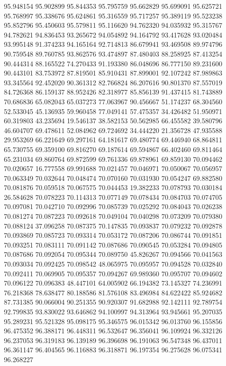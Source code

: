 95.948154
95.902899
95.844353
95.795759
95.662829
95.699091
95.625721
95.768997
95.338676
95.624861
95.316559
95.717257
95.389119
95.523238
95.852796
95.450603
95.579811
95.116620
94.762320
94.035932
95.315767
94.782621
94.836453
93.265672
94.054892
94.164792
93.417628
93.020484
93.995148
91.374233
94.165164
92.714813
86.679941
93.469508
89.974796
90.759548
89.760785
93.862576
93.474897
87.480403
88.258925
87.413254
90.444314
88.165522
74.270433
91.193380
86.048696
86.777150
89.231600
90.443101
83.753972
87.819501
85.910431
87.899001
92.107242
87.989863
93.345564
92.452020
90.361312
82.766824
86.207616
90.801370
87.557019
84.726368
86.159137
88.952426
82.318977
85.856139
91.437415
81.743889
70.686836
65.082043
65.037273
77.063967
90.456667
51.174237
68.304560
52.533045
45.136935
59.960458
77.049141
57.475357
34.426482
51.950971
60.319803
43.235694
19.546137
38.582153
50.562985
66.455582
39.580796
46.604707
69.478611
52.084962
69.724692
34.444220
21.356728
47.935588
29.953269
66.221649
69.297161
64.181617
69.480774
69.446940
68.864811
65.730755
69.359100
69.816270
69.187614
69.594867
66.402460
69.811464
65.231034
69.860764
69.872599
69.761336
69.878961
69.859130
70.094462
70.020657
16.777558
69.991688
70.021457
70.046971
70.050067
70.056957
70.063349
70.032644
70.048474
70.070160
70.031930
70.054247
69.882580
70.081876
70.059518
70.067575
70.044453
19.382233
70.078793
70.030184
26.584628
70.078223
70.114313
70.077149
70.078434
70.084703
70.074705
70.097081
70.042710
70.092996
70.085739
70.025292
70.084043
70.026238
70.081274
70.087223
70.092618
70.049104
70.040298
70.073209
70.079380
70.088124
37.096258
70.087375
70.147835
70.093837
70.079232
70.092878
70.093869
70.085723
70.093314
70.053172
70.087206
70.086744
70.091851
70.093251
70.083111
70.091142
70.087686
70.090545
70.053284
70.094805
70.087686
70.092054
70.095344
70.089750
45.826267
70.094566
70.041563
70.093034
70.092425
70.098542
48.065975
70.095957
70.094528
70.032840
70.092411
70.069905
70.095357
70.094267
69.989360
70.095707
70.094602
70.096122
70.096383
48.447101
64.005902
66.194382
73.145327
74.236991
76.218368
78.638477
80.188586
81.576108
83.496984
84.622422
85.924682
87.731385
90.066004
90.251355
90.920307
91.682988
92.142111
92.789754
92.799835
93.830022
93.646862
94.100997
94.313964
93.945661
95.207035
95.289231
95.521328
95.098175
95.346575
96.015342
96.013760
96.155856
96.475352
96.388171
96.448311
96.532647
96.356041
96.109924
96.332126
96.237053
96.319183
96.139189
96.396698
96.191063
96.547348
96.437011
96.361147
96.404565
96.116883
96.318871
96.197354
96.275628
96.075341
96.268227
